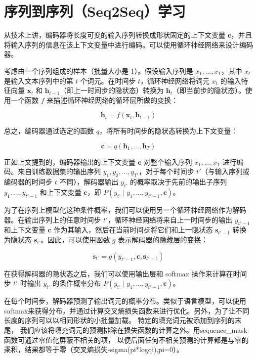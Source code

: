 \setcounter{section}{7}

\hypertarget{ux5e8fux5217ux5230ux5e8fux5217seq2sequx5b66ux4e60}{%
\section{序列到序列（Seq2Seq）学习}\label{ux5e8fux5217ux5230ux5e8fux5217seq2sequx5b66ux4e60}}

从技术上讲，编码器将长度可变的输入序列转换成形状固定的上下文变量 \(\mathbf{c}\)，并且将输入序列的信息在该上下文变量中进行编码。可以使用循环神经网络来设计编码器。

考虑由一个序列组成的样本（批量大小是 1）。假设输入序列是 \(x_1,\ldots,x_T\)，其中 \(x_t\) 是输入文本序列中的第 \(t\) 个词元。在时间步 \(t\)，循环神经网络将词元 \(x_t\) 的输入特征向量 \(\mathbf{x}_t\) 和 \(\mathbf{h}_{t-1}\)（即上一时间步的隐状态）转换为 \(\mathbf{h}_t\)（即当前步的隐状态）。使用一个函数 \(f\) 来描述循环神经网络的循环层所做的变换：

\[
\mathbf{h}_t = f(\mathbf{x}_t,\mathbf{h}_{t-1})
\]

总之，编码器通过选定的函数 \(q\)，将所有时间步的隐状态转换为上下文变量：

\[
\mathbf{c} = q(\mathbf{h}_1,\ldots,\mathbf{h}_T)
\]

正如上文提到的，编码器输出的上下文变量 \(\mathbf{c}\) 对整个输入序列 \(x_1,\ldots,x_T\) 进行编码。来自训练数据集的输出序列 \(y_1,y_2,\ldots,y_{T'}\)，对于每个时间步 \(t'\)（与输入序列或编码器的时间步 \(t\) 不同），解码器输出 \(y_{t'}\) 的概率取决于先前的输出子序列 \(y_1,\ldots,y_{t'-1}\) 和上下文变量 \(\mathbf{c}\)，即 \(P(y_{t'} \mid y_1,\ldots,y_{t'-1},\mathbf{c})\)。

为了在序列上模型化这种条件概率，我们可以使用另一个循环神经网络作为解码器。在输出序列上的任意时间步 \(t'\)，循环神经网络将来自上一时间步的输出 \(y_{t'-1}\) 和上下文变量 \(\mathbf{c}\) 作为其输入，然后在当前时间步将它们和上一隐状态 \(\mathbf{s}_{t'-1}\) 转换为隐状态 \(\mathbf{s}_{t'}\)。因此，可以使用函数 \(g\) 表示解码器的隐藏层的变换：

\[
\mathbf{s}_{t'} = g(y_{t'-1},\mathbf{c},\mathbf{s}_{t'-1})
\]

在获得解码器的隐状态之后，我们可以使用输出层和 softmax 操作来计算在时间步 \(t'\) 时输出 \(y_{t'}\) 的条件概率分布 \(P(y_{t'} \mid y_1,\ldots,y_{t'-1},\mathbf{c})\)。

在每个时间步，解码器预测了输出词元的概率分布。类似于语言模型，可以使用softmax来获得分布，并通过计算交叉熵损失函数来进行优化。另外，为了让不同长度的序列可以以相同形状的小批量加载。 特定的填充词元被添加到序列的末尾， 我们应该将填充词元的预测排除在损失函数的计算之外。用sequence\_mask函数可通过零值化屏蔽不相关的项， 以便后面任何不相关预测的计算都是与零的乘积，结果都等于零（交叉熵损失-sigma(pi*logqi),pi=0）。

